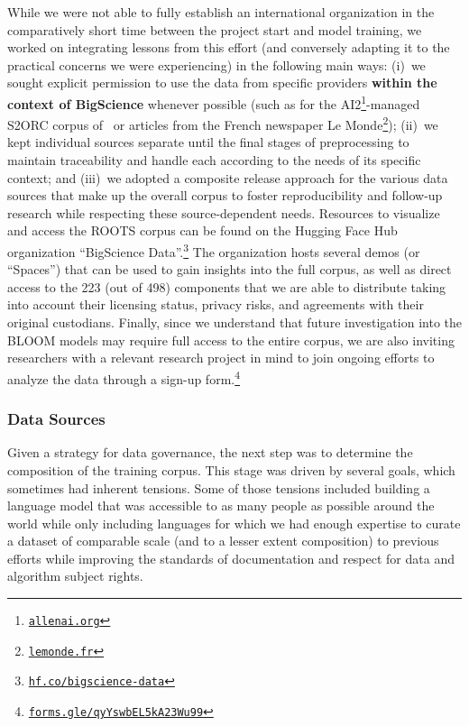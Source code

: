 \documentclass[twoside,11pt]{article}
\begin{document}
While we were not able to fully establish an international organization in the comparatively short time between the project start and model training, we worked on integrating lessons from this effort (and conversely adapting it to the practical concerns we were experiencing) in the following main ways: (i)~we sought explicit permission to use the data from specific providers \textbf{within the context of BigScience} whenever possible (such as for the AI2\footnote{\href{https://allenai.org/}{\texttt{allenai.org}}}-managed S2ORC corpus of~\citet{lo2020s2orc} or articles from the French newspaper Le Monde\footnote{\href{https://www.lemonde.fr/}{\texttt{lemonde.fr}}}); (ii)~we kept individual sources separate until the final stages of preprocessing to maintain traceability and handle each according to the needs of its specific context; and (iii)~we adopted a composite release approach for the various data sources that make up the overall corpus to foster reproducibility and follow-up research while respecting these source-dependent needs.
%
Resources to visualize and access the ROOTS corpus can be found on the Hugging Face Hub organization ``BigScience Data''.\footnote{\href{https://hf.co/bigscience-data}{\texttt{hf.co/bigscience-data}}} The organization hosts several demos (or ``Spaces'') that can be used to gain insights into the full corpus, as well as direct access to the 223 (out of 498) components that we are able to distribute taking into account their licensing status, privacy risks, and agreements with their original custodians. Finally, since we understand that future investigation into the BLOOM models may require full access to the entire corpus, we are also inviting researchers with a relevant research project in mind to join ongoing efforts to analyze the data through a sign-up form.\footnote{\href{https://forms.gle/qyYswbEL5kA23Wu99}{{\texttt{forms.gle/qyYswbEL5kA23Wu99}}}}


\subsubsection{Data Sources}
\label{sec:sourcing}

Given a strategy for data governance, the next step was to determine the composition of the training corpus. This stage was driven by several goals, which sometimes had inherent tensions.
Some of those tensions included building a language model that was accessible to as many people as possible around the world while only including languages for which we had enough expertise to curate a dataset of comparable scale (and to a lesser extent composition) to previous efforts while improving the standards of documentation and respect for data and algorithm subject rights.
\end{document}
